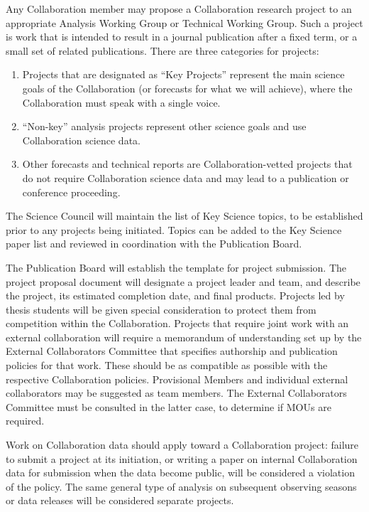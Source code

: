 \documentclass[12pt]{article}
\begin{document}
Any Collaboration member may propose a Collaboration research project to an appropriate Analysis Working Group or Technical Working Group.  Such a project is work that is intended to result in a journal publication after a fixed term, or a small set of related publications.  There are three categories for projects:
\begin{enumerate}
  \item Projects that are designated as ``Key Projects'' represent the main science goals of the Collaboration (or forecasts for what we will achieve), where the Collaboration must speak with a single voice.  
\item ``Non-key''  analysis projects represent other science goals and use Collaboration science data.  
\item Other forecasts and technical reports are Collaboration-vetted projects that do not require Collaboration science data and may lead to a publication or conference proceeding.  
\end{enumerate}
The Science Council will maintain the list of Key Science topics, to be established prior to any projects being initiated.  Topics can be added to the Key Science paper list and reviewed in coordination with the Publication Board.

The Publication Board will establish the template for project submission.  The project proposal document will designate a project leader and team, and describe the project, its estimated completion date, and final products.  
Projects led by thesis students will be given special consideration to protect them from competition within the Collaboration.  Projects that require joint work with an external collaboration will require a memorandum of understanding set up by the External Collaborators Committee that specifies authorship and publication policies for that work.  These should be as compatible as possible with the respective Collaboration policies.  Provisional Members and individual external collaborators may be suggested as team members.  The External Collaborators Committee must be consulted in the latter case, to determine if MOUs are required.  


Work on Collaboration data should apply toward a Collaboration project: failure to submit a project at its initiation, or writing a paper on internal Collaboration data for submission when the data become public, will be considered a violation of the policy.  The same general type of analysis on subsequent observing seasons or data releases will be considered separate projects.
\end{document}
